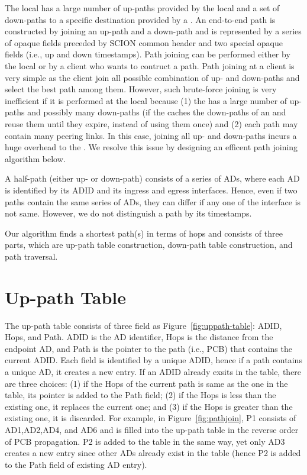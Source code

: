 The local \PS has a large number of up-paths provided by the local \BS and a set of down-paths to a specific destination \AD provided by a \ISDC \PS.
An end-to-end path is constructed by joining an up-path and a down-path and is represented by a series of opaque fields preceded by SCION common header and two special opaque fields (i.e., up and down timestamps). Path joining can be performed either by the local \PS or by a client who wants to contruct a path. Path joining at a client is very simple as the client join all possible combination of up- and down-paths and select the best path among them. However, such brute-force joining is very inefficient if it is performed at the local \PS because (1) the \PS has a large number of up-paths and possibly many down-paths (if the \PS caches the down-paths of an \AD and reuse them until they expire, instead of using them once) and (2) each path may contain many peering links. In this case, joining all up- and down-paths incurs a huge overhead to the \PS. We resolve this issue by designing an efficent path joining algorithm below.

A half-path (either up- or down-path) consists of a series of ADs, where each AD is identified by its ADID and its ingress and egress interfaces. Hence, even if two paths contain the same series of ADs, they can differ if any one of the interface is not same. However, we do not distinguish a path by its timestamps.

Our algorithm finds a shortest path(s) in terms of \AD hops and consists of three parts, which are up-path table construction, down-path table construction, and path traversal.

\section{Up-path Table}
The up-path table consists of three field as Figure~\ref{fig:uppath-table}: ADID, Hops, and Path. ADID is the AD identifier, Hops is the distance from the endpoint AD, and Path is the pointer to the path (i.e., PCB) that contains the current ADID. Each field is identified by a unique ADID, hence if a path contains a unique AD, it creates a new entry. If an ADID already exsits in the table, there are three choices: (1) if the Hops of the current path is same as the one in the table, its pointer is added to the Path field; (2) if the Hops is less than the existing one, it replaces the current one; and (3) if the Hops is greater than the existing one, it is discarded. For example, in Figure~\ref{fig:pathjoin}, P1 consists of AD1,AD2,AD4, and AD6 and is filled into the up-path table in the reverse order of PCB propagation. P2 is added to the table in the same way, yet only AD3 creates a new entry since other ADs already exist in the table (hence P2 is added to the Path field of existing AD entry).

